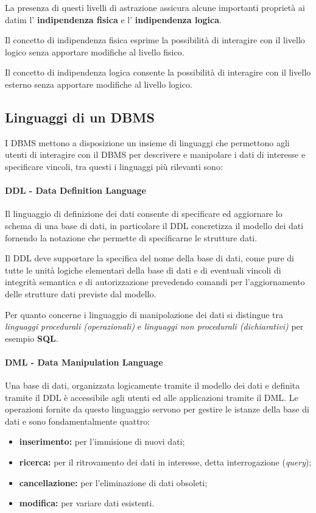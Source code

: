 La presenza di questi livelli di astrazione assicura alcune importanti proprietà
ai datim l' \textbf{indipendenza fisica} e l' \textbf{indipendenza logica}.

Il concetto di indipendenza fisica esprime la possibilità di interagire con il
livello logico senza apportare modifiche al livello fisico.

Il concetto di indipendenza logica consente la possibilità di interagire con il
livello esterno senza apportare modifiche al livello logico.

\subsection{Linguaggi di un DBMS}%
\label{ssub:Linguaggi di un DBMS}
I DBMS mettono a disposizione un insieme di linguaggi che permettono agli utenti
di interagire con il DBMS per descrivere e manipolare i dati di interesse e
specificare vincoli, tra questi i linguaggi più rilevanti sono:

\paragraph{DDL - Data Definition Language}%
\label{par:DDL - Data Definition Language}
Il linguaggio di definizione dei dati consente di specificare ed aggiornare lo
schema di una base di dati, in particolare il DDL concretizza il modello dei
dati fornendo la notazione che permette di specificarne le strutture dati.

Il DDL deve supportare la specifica del nome della base di dati, come pure di
tutte le unità logiche elementari della base di dati e di eventuali vincoli di
integrità semantica e di autorizzazione prevedendo comandi per l'aggiornamento
delle strutture dati previste dal modello.

Per quanto concerne i linguaggio di manipolazione dei dati si distingue tra
\emph{linguaggi procedurali (operazionali)} e \emph{linguaggi non procedurali
(dichiarativi)} per esempio \textbf{SQL}.

\paragraph{DML - Data Manipulation Language}%
\label{par:DML - Data Manipulation Language}
Una base di dati, organizzata logicamente tramite il modello dei dati e definita
tramite il DDL è accessibile agli utenti ed alle applicazioni tramite il DML.
Le operazioni fornite da questo linguaggio servono per gestire le istanze della
base di dati e sono fondamentalmente quattro:
\begin{itemize}
  \item \textbf{inserimento:} per l'immisione di nuovi dati;
  \item \textbf{ricerca:} per il ritrovamento dei dati in interesse, detta
    interrogazione (\textit{query});
  \item \textbf{cancellazione:} per l'eliminazione di dati obsoleti;
  \item \textbf{modifica:} per variare dati esistenti.
\end{itemize}

